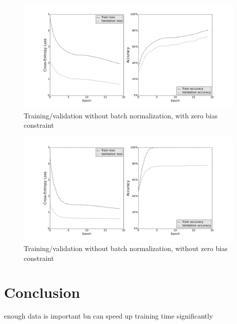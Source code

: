 \documentclass[a4paper, 11pt]{article}
\begin{document}
\begin{figure}
	\includegraphics[width=\linewidth]{no-bn_bias-constraint.png}
	\caption{Training/validation without batch normalization, with zero bias constraint}
	\label{fig:no-bn_bias}
\end{figure}
		
\begin{figure}
	\includegraphics[width=\linewidth]{no-bn_no-bias-constraint.png}
	\caption{Training/validation without batch normalization, without zero bias constraint}
	\label{fig:no-bn_no-bias}
\end{figure}

\section{Conclusion}
enough data is important
bn can speed up training time significantly


\clearpage

\end{document}
